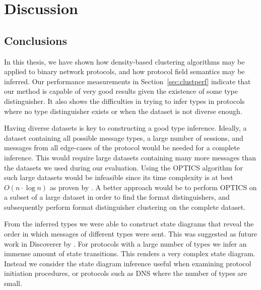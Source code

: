 \documentclass[a4paper]{report}
\begin{document}
\chapter{Discussion}

\section{Conclusions}
In this thesis, we have shown how density-based clustering algorithms may be
applied to binary network protocols, and how protocol field semantics may be
inferred. Our performance measurements in Section~\ref{sec:clustperf} indicate
that our method is capable of very good results given the existence of some
type distinguisher. It also shows the difficulties in trying to infer types
in protocols where no type distinguisher exists or when the dataset is
not diverse enough.

Having diverse datasets is key to constructing a good type inference. Ideally, a
dataset containing all possible message types, a large number of sessions,
and messages from all edge-cases of the protocol would be needed for a
complete inference. This would require large datasets containing many more
messages than the datasets we used during our evaluation. Using the OPTICS
algorithm for such large datasets would be infeasible since its time
complexity is at best $O(n \cdot \log n)$ as proven by \citet{ankerst99}.
A better approach would be to perform OPTICS on a subset of a large dataset
in order to find the format distinguishers, and subsequently perform
format distinguisher clustering on the complete dataset.

From the inferred types we were able to construct state diagrams that reveal
the order in which messages of different types were sent. This was suggested
as future work in Discoverer by \citet{cui07}. For protocols with a large
number of types we infer an immense amount of state transitions. This renders
a very complex state diagram. Instead we consider the state diagram inference
useful when examining protocol initiation procedures, or protocols such as
DNS where the number of types are small.
\end{document}
